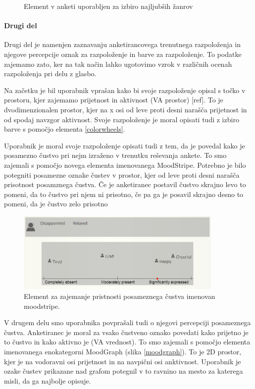 \documentclass[a4paper, 12pt]{book}
\begin{document}
{\begin{figure}[h!t]
\caption{Element v anketi uporabljen za izbiro najljubših žanrov}
\label{genresel}
\end{figure}

\paragraph{Drugi del}

Drugi del je namenjen zaznavanju anketirancovega trenutnega razpoloženja in njegove percepcije oznak za razpoloženje in barve za razpoloženje. To podatke zajemamo zato, ker na tak način lahko ugotovimo vzrok v različnih ocenah razpoloženja pri delu z glasbo. 

Na začetku je bil uporabnik vprašan kako bi svoje razpoloženje opisal s točko v prostoru, kjer zajemamo prijetnost in aktivnost (VA prostor) [ref]. To je dvodimenzionalen prostor, kjer na x osi od leve proti desni narašča prijetnost in od spodaj navzgor aktivnost.    Svoje razpoloženje je moral opisati tudi z izbiro barve s pomočjo elementa \ref{colorwheels}. 

Uporabnik je moral svoje razpoloženje opisati tudi z tem, da je povedal kako je posamezno čustvo pri nejm izraženo v trenutku reševanja ankete. To smo zajemali s pomočjo novega elementa imenovanega MoodStripe. Potrebno je bilo potegniti posamezne oznake čustev v prostor, kjer od leve proti desni narašča prisotnost posamznega čustva. Če je anketiranec postavil čustvo skrajno levo to pomeni, da to čustvo pri njem ni prisotno, če pa ga je posavil skrajno desno to pomeni, da je čustvo zelo prisotno 

\begin{figure}[ht]
\centering
\includegraphics[width=10cm]{moodstripe.png}

\caption{Element za zajemanje pristnosti posameznega čustva imenovan moodstripe.}
\label{moodstripe}
\end{figure}

V drugem delu smo uporabnika povprašali tudi o njegovi percepciji posameznega čustva. Anketiranec je moral za vsako čustveno oznako povedati kako prijetno je to čustvo in kako aktivno je (VA vrednost). To smo zajemali s pomočjo elementa imenovanega enokategorni MoodGraph (slika \ref{moodgraph}). To je 2D prostor, kjer je na vodoravni osi prijetnost in na navpični osi anktivnost. Uporabnik je ozake čustev prikazane nad grafom potegnil v to ravnino na mesto za katerega misli, da ga najbolje opisuje. 

}
\end{document}

